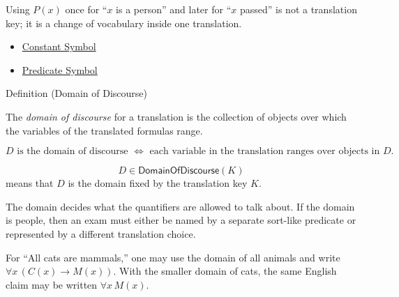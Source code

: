 \begin{remark*}
Using \(P(x)\) once for ``\(x\) is a person'' and later for ``\(x\) passed'' is
not a translation key; it is a change of vocabulary inside one translation.
\end{remark*}

\begin{dependencies}
\begin{itemize}
  \item \hyperref[def:constant-symbol]{Constant Symbol}
  \item \hyperref[def:predicate-symbol]{Predicate Symbol}
\end{itemize}
\end{dependencies}

\begin{definitionbox}{Definition (Domain of Discourse)}
\begin{definition}
\label{def:domain-of-discourse-predicate-logic}
The \emph{domain of discourse} for a translation is the collection of objects
over which the variables of the translated formulas range.
\end{definition}
\end{definitionbox}

\begin{remark*}
\[
D \text{ is the domain of discourse }
\Longleftrightarrow
\text{ each variable in the translation ranges over objects in }D.
\]
\end{remark*}

\begin{remark*}
\[
  D\in\mathsf{DomainOfDiscourse}(K)
\] means that \(D\) is the domain fixed
by the translation key \(K\).
\end{remark*}

\begin{remark*}[Interpretation]
The domain decides what the quantifiers are allowed to talk about. If the
domain is people, then an exam must either be named by a separate sort-like
predicate or represented by a different translation choice.
\end{remark*}

\begin{remark*}[Examples]
For ``All cats are mammals,'' one may use the domain of all animals and write
\(\forall x\,(C(x)\to M(x))\). With the smaller domain of cats, the same English
claim may be written \(\forall x\,M(x)\).
\end{remark*}

